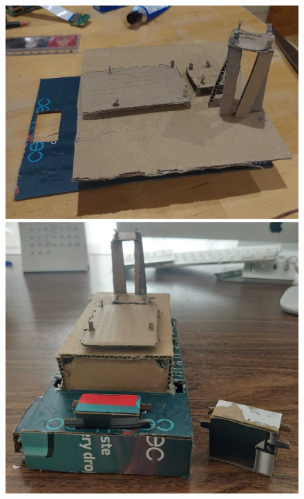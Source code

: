\begin{figure}[ht!]
	\centering
	\begin{minipage}{0.5\linewidth}
		\centering
		\includegraphics[width=\linewidth]{figs/cap5/boceto_carton1.jpeg}
		\caption*{\centering}
	\end{minipage}
	\hspace{1cm}
	\begin{minipage}{0.4\linewidth}
		\centering
		\includegraphics[width=\linewidth]{figs/cap5/boceto_carton2.jpeg}
		\caption*{\centering}
	\end{minipage}

\end{figure}
